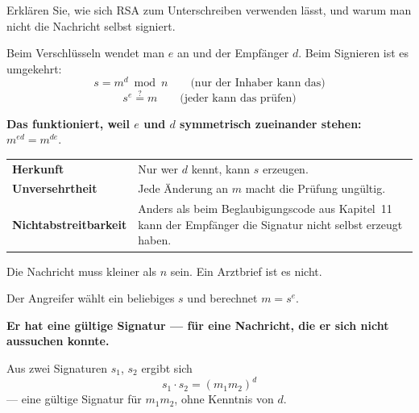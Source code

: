 \begin{aufgabe}
Erklären Sie, wie sich RSA zum Unterschreiben verwenden lässt, und warum man nicht die Nachricht selbst signiert.

\loesung
{}
Beim Verschlüsseln wendet man $e$ an und der Empfänger $d$. Beim Signieren ist es umgekehrt:
\[ s = m^{d} \bmod n \qquad\text{(nur der Inhaber kann das)} \]
\[ s^{e} \stackrel{?}{=} m \qquad\text{(jeder kann das prüfen)} \]

\begin{center}
\begin{minipage}{0.9\textwidth}
\textbf{Das funktioniert, weil $e$ und $d$ symmetrisch zueinander stehen:} $m^{ed} = m^{de}$.
\end{minipage}
\end{center}

\begin{center}
{\small
\renewcommand{\arraystretch}{1.5}
\begin{tabular}{@{}P{3.2cm}P{5.4cm}@{}}
\toprule
\textbf{Herkunft} & Nur wer $d$ kennt, kann $s$ erzeugen.\\
\textbf{Unversehrtheit} & Jede Änderung an $m$ macht die Prüfung ungültig.\\
\textbf{Nicht\-abstreitbarkeit} & Anders als beim Beglaubigungscode aus Kapitel~11 kann der Empfänger die Signatur nicht selbst erzeugt haben.\\
\bottomrule
\end{tabular}}
\end{center}

 Die Nachricht muss kleiner als $n$ sein. Ein Arztbrief ist es nicht.

 Der Angreifer wählt ein beliebiges $s$ und berechnet $m = s^{e}$.

\begin{center}
\begin{minipage}{0.9\textwidth}
\textbf{Er hat eine gültige Signatur --- für eine Nachricht, die er sich nicht aussuchen konnte.}
\end{minipage}
\end{center}

 Aus zwei Signaturen $s_1$, $s_2$ ergibt sich
\[ s_1\cdot s_2 = (m_1 m_2)^{d} \]
--- eine gültige Signatur für $m_1 m_2$, ohne Kenntnis von $d$.


\end{aufgabe}
